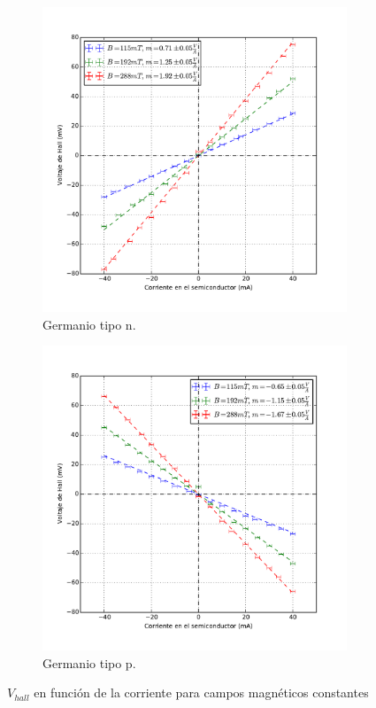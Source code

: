 \documentclass[twocolumn,showkeys,preprintnumbers,amsmath,amssymb]{revtex4}
\begin{document}
		\begin{widetext}
			
			\begin{figure}[H]
				\centering
				\begin{subfigure}[b]{0.45\textwidth}
					\includegraphics[width=\textwidth]{BConst-NGe.pdf}
					\caption{Germanio tipo n.}
					\label{fig:BConst-NGe}
				\end{subfigure}
				\begin{subfigure}[b]{0.45\textwidth}
					\includegraphics[width=\textwidth]{BConst-PGe.pdf}
					\caption{Germanio tipo p.}
					\label{fig:BConst-PGe}
				\end{subfigure}
				\caption{$V_{hall}$ en función de la corriente para campos magnéticos constantes}
				\label{fig:BConst}
			\end{figure}
			

\end{widetext}
\end{document}
